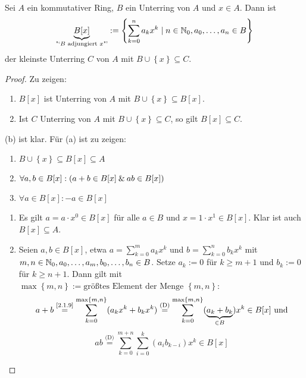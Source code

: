 \documentclass[../../main.tex]{subfiles}
\begin{document}
\begin{notsat}\label{3.2.4}
Sei $A$ ein kommutativer Ring, $B$ ein Unterring von $A$ und $x\in A$. Dann ist
$$\underbrace{B[x]}_\text{"`$B$ adjungiert $x$"'} :=\left\{\sum_{k=0}^n a_kx^k\mid n\in\mathbb N_0, a_0,\ldots,a_n\in B\right\}$$
der kleinste Unterring $C$ von $A$ mit $B\cup \left\{x\right\}\subseteq C$.
\end{notsat}
\begin{proof}
Zu zeigen:
\begin{enumerate}[\normalfont(a)]
\item $B[x]$ ist Unterring von $A$ mit $B\cup \left\{x\right\}\subseteq B[x]$.
\item Ist $C$ Unterring von $A$ mit $B\cup \left\{x\right\}\subseteq C$, so gilt $B[x]\subseteq C$.
\end{enumerate}
(b) ist klar.
Für (a) ist zu zeigen:
\begin{enumerate}[(1)]
\item $B\cup \left\{x\right\}\subseteq B[x]\subseteq A$
\item $\forall a,b\in B[x]:(a+b\in B[x]\mathbin{\&} ab\in B[x])$
\item $\forall a\in B[x]:-a\in B[x]$
\end{enumerate}
\begin{enumerate}[Zu (1).]
\item Es gilt $a=a\cdot x^0\in B[x]$ für alle $a\in B$ und $x=1\cdot x^1\in B[x]$. Klar ist auch $B[x]\subseteq A$.
\item Seien $a,b\in B[x]$, etwa $a=\sum_{k=0}^m a_k x^k$ und $b=\sum_{k=0}^n b_k x^k$ mit\\ $m,n\in\mathbb N_0, a_0, \ldots, a_m,b_0, \ldots, b_n\in B$. Setze $a_k:=0$ für $k\geq m+1$ und $b_k:= 0$ für $k\geq n+1$. Dann gilt mit $\max\left\{m,n\right\}:=\text{größtes Element der Menge $\left\{m,n\right\}$}$:
$$a+b\overset{\text{\ref{2.1.9}}}=\sum_{k=0}^{\max\left\{m,n\right\}}(a_kx^k +b_kx^k)\overset{\text{(D)}}= \sum_{k=0}^{\max\left\{m,n\right\}}(\underbrace{a_k+b_k}_{\in B})x^k\in B[x] \text{ und}$$
$$ab\overset{\text{(D)}}=\sum_{k=0}^{m+n}\sum_{i=0}^{k}(a_ib_{k-i})x^k\in B[x]$$
\begin{center}
\end{center}
\end{enumerate}
\end{proof}
\end{document}
